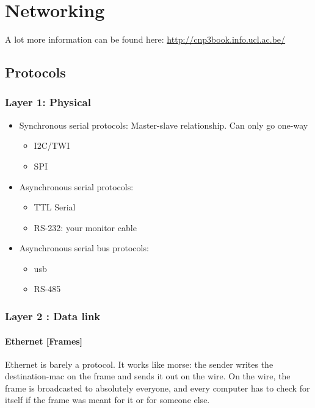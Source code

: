 \section{Networking}

A lot more information can be found here: \href{http://cnp3book.info.ucl.ac.be/}{http://cnp3book.info.ucl.ac.be/}

\subsection{Protocols}


\subsubsection{Layer 1: Physical}

\begin{itemize}
    \item Synchronous serial protocols: Master-slave relationship. Can only go one-way
        \begin{itemize}
            \item I2C/TWI
            \item SPI
        \end{itemize}
    \item Asynchronous serial protocols: 
        \begin{itemize}
            \item TTL Serial
            \item RS-232: your monitor cable 
        \end{itemize}
    \item Asynchronous serial bus protocols: 
        \begin{itemize}
            \item usb
            \item RS-485
        \end{itemize}
\end{itemize}

\subsubsection{Layer 2 : Data link}

\paragraph{Ethernet [Frames]} 

Ethernet is barely a protocol. It works like morse: the sender writes the destination-mac on the frame and sends it out on the wire. On the wire, the frame is broadcasted to absolutely everyone, and every computer has to check for itself if the frame was meant for it or for someone else. 

